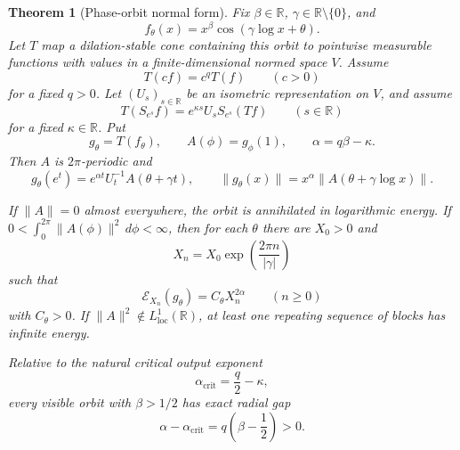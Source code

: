 \documentclass[11pt,a4paper]{amsart}
\newtheorem{theorem}{Theorem}[section]
\theoremstyle{definition}
\newcommand{\R}{\mathbb R}
\newcommand{\norm}[1]{\lVert #1\rVert}
\newcommand{\cE}{\mathcal E}
\begin{document}
\begin{theorem}[Phase-orbit normal form]\label{thm:phase}
Fix $\beta\in\R$, $\gamma\in\R\setminus\{0\}$, and
\[
 f_\theta(x)=x^\beta\cos(\gamma\log x+\theta).
\]
Let $T$ map a dilation-stable cone containing this orbit to pointwise measurable functions with values in a finite-dimensional normed space $V$.  Assume
\begin{equation}\label{eq:q-hom-phase}
 T(cf)=c^qT(f)\qquad(c>0)
\end{equation}
for a fixed $q>0$.  Let $(U_s)_{s\in\R}$ be an isometric representation on $V$, and assume
\begin{equation}\label{eq:phase-covariance}
 T(S_{e^s}f)=e^{\kappa s}U_sS_{e^s}(Tf)
 \qquad(s\in\R)
\end{equation}
for a fixed $\kappa\in\R$.  Put
\[
 g_\theta=T(f_\theta),
 \qquad A(\phi)=g_\phi(1),
 \qquad \alpha=q\beta-\kappa.
\]
Then $A$ is $2\pi$-periodic and
\begin{equation}\label{eq:phase-normal-form}
 g_\theta(e^t)
 =e^{\alpha t}U_t^{-1}A(\theta+\gamma t),
 \qquad
 \norm{g_\theta(x)}=x^\alpha
 \norm{A(\theta+\gamma\log x)}.
\end{equation}

If $\norm{A}=0$ almost everywhere, the orbit is annihilated in logarithmic
energy.  If
$0<\int_0^{2\pi}\norm{A(\phi)}^2\,d\phi<\infty$, then for each $\theta$ there
are $X_0>0$ and
\begin{equation}\label{eq:phase-subsequence}
 X_n=X_0\exp\left(\frac{2\pi n}{|\gamma|}\right)
\end{equation}
such that
\begin{equation}\label{eq:phase-energy}
 \cE_{X_n}(g_\theta)=C_\theta X_n^{2\alpha}
 \qquad(n\ge0)
\end{equation}
with $C_\theta>0$.  If $\norm{A}^2\notin L^1_{\mathrm{loc}}(\R)$, at least
one repeating sequence of blocks has infinite energy.

Relative to the natural critical output exponent
\begin{equation}\label{eq:phase-critical}
  \alpha_{\mathrm{crit}}=\frac q2-\kappa,
\end{equation}
every visible orbit with $\beta>1/2$ has exact radial gap
\begin{equation}\label{eq:phase-gap}
  \alpha-\alpha_{\mathrm{crit}}
  =q\left(\beta-\frac12\right)>0.
\end{equation}
\end{theorem}
\end{document}
